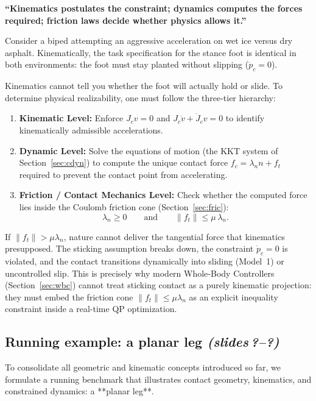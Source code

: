 \documentclass[11pt,a4paper]{article}
\newcommand{\sr}{\emph{(slides\,?--?)}}
\newcommand{\Jc}{J_c}
\begin{document}
\begin{intuition}
\textbf{``Kinematics postulates the constraint; dynamics computes the forces required; friction laws decide whether physics allows it.''}

Consider a biped attempting an aggressive acceleration on wet ice versus dry asphalt. Kinematically, the task specification for the stance foot is identical in both environments: the foot must stay planted without slipping ($\dot p_c = 0$).

Kinematics cannot tell you whether the foot will actually hold or slide. To determine physical realizability, one must follow the three-tier hierarchy:
\begin{enumerate}[nosep]
  \item \textbf{Kinematic Level:} Enforce $\Jc v = 0$ and $\Jc \dot v + \dot J_c v = 0$ to identify kinematically admissible accelerations.
  \item \textbf{Dynamic Level:} Solve the equations of motion (the KKT system of Section~\ref{sec:cdyn}) to compute the unique contact force $f_c = \lambda_n n + f_t$ required to prevent the contact point from accelerating.
  \item \textbf{Friction / Contact Mechanics Level:} Check whether the computed force lies inside the Coulomb friction cone (Section~\ref{sec:fric}):
  \[
    \lambda_n \ge 0 \qquad \text{and} \qquad \|f_t\| \le \mu\,\lambda_n.
  \]
\end{enumerate}
If $\|f_t\| > \mu\lambda_n$, nature cannot deliver the tangential force that kinematics presupposed. The sticking assumption breaks down, the constraint $\dot p_c=0$ is violated, and the contact transitions dynamically into sliding (Model~1) or uncontrolled slip. This is precisely why modern Whole-Body Controllers (Section~\ref{sec:wbc}) cannot treat sticking contact as a purely kinematic projection: they must embed the friction cone $\|f_t\| \le \mu\lambda_n$ as an explicit inequality constraint inside a real-time QP optimization.
\end{intuition}

\subsection{Running example: a planar leg \sr}\label{sec:planar_leg}

To consolidate all geometric and kinematic concepts introduced so far, we formulate a running benchmark that illustrates contact geometry, kinematics, and constrained dynamics: a **planar leg**.
\end{document}
